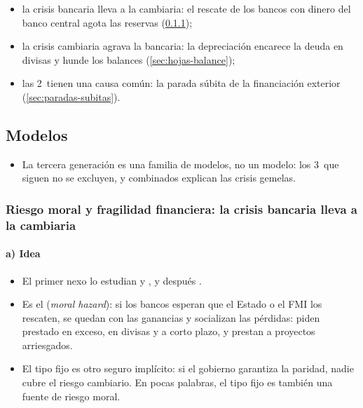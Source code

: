 \documentclass[11pt]{article}
\begin{document}
\begin{itemize}
  \begin{itemize}
  \item la crisis bancaria lleva a la cambiaria: el rescate de los bancos con dinero del banco central agota las reservas (\ref{sec:riesgo-moral});
  \item la crisis cambiaria agrava la bancaria: la depreciación encarece la deuda en divisas y hunde los balances (\ref{sec:hojas-balance});
  \item las 2~tienen una causa común: la parada súbita de la financiación exterior (\ref{sec:paradas-subitas}).
  \end{itemize}
\end{itemize}

\subsection{Modelos}\label{sec:tercera-modelos}

\begin{itemize}
\item La tercera generación es una familia de modelos, no un modelo: los 3~que siguen no se excluyen, y combinados explican las crisis gemelas.
\end{itemize}

\subsubsection{Riesgo moral y fragilidad financiera: la crisis bancaria lleva a la cambiaria}\label{sec:riesgo-moral}

\paragraph{a) Idea}

\begin{itemize}
\item El primer nexo lo estudian \textcite{McKinnonPill1998} y \textcite{Krugman1998Asia}, y después \textcite{CPR1999PaperTigers}.
\item Es el  (\emph{moral hazard}): si los bancos esperan que el Estado o el FMI los rescaten, se quedan con las ganancias y socializan las pérdidas: piden prestado en exceso, en divisas y a corto plazo, y prestan a proyectos arriesgados\nocite{McKinnonPill1998,Krugman1998Asia}.
\item El tipo fijo es otro seguro implícito: si el gobierno garantiza la paridad, nadie cubre el riesgo cambiario. En pocas palabras, el tipo fijo es también una fuente de riesgo moral.
\end{itemize}
\end{document}
